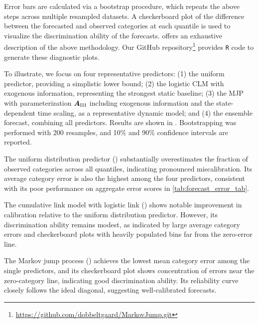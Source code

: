 Error bars are calculated via a bootstrap procedure, which repeats the above steps across multiple resampled datasets. A checkerboard plot of the difference between the forecasted and observed categories at each quantile is used to visualize the discrimination ability of the forecasts. \citet{hamill1997} offers an exhaustive description of the above methodology. Our GitHub repository\footnote{\url{https://github.com/dobbeltgaard/MarkovJump.git}} provides \texttt{R} code to generate these diagnostic plots.


To illustrate, we focus on four representative predictors: 
(1) the uniform predictor, providing a simplistic lower bound; 
(2) the logistic CLM with exogenous information, representing the strongest static baseline; 
(3) the MJP with parameterization $\bm{A}_{\RN{3}}$ including exogenous information and the state-dependent time scaling, as a representative dynamic model; and 
(4) the ensemble forecast, combining all predictors. 
Results are shown in . Bootstrapping was performed with 200 resamples, and 10\% and 90\% confidence intervals are reported.



The uniform distribution predictor () substantially overestimates the fraction of observed categories across all quantiles, indicating pronounced miscalibration.
Its average category error is also the highest among the four predictors, consistent with its poor performance on aggregate error scores in \cref{tab:forecast_error_tab}.

The cumulative link model with logistic link () shows notable improvement in calibration relative to the uniform distribution predictor.
However, its discrimination ability remains modest, as indicated by large average category errors and checkerboard plots with heavily populated bins far from the zero-error line.

The Markov jump process () achieves the lowest mean category error among the single predictors, and its checkerboard plot shows concentration of errors near the zero-category line, indicating good discrimination ability.
Its reliability curve closely follows the ideal diagonal, suggesting well-calibrated forecasts.

